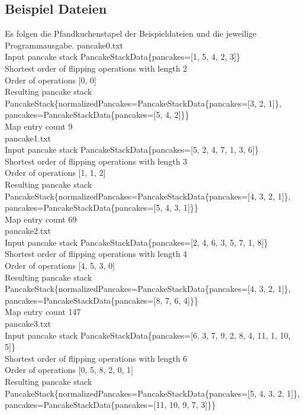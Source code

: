 \subsection{Beispiel Dateien}\label{subsec:beispiel-dateien}
Es folgen die Pfandkuchenstapel der Beispieldateien und die jeweilige Programmausgabe.
pancake0.txt \\
Input pancake stack PancakeStackData\{pancakes=[1, 5, 4, 2, 3]\} \\
Shortest order of flipping operations with length 2 \\
Order of operations [0, 0] \\
Resulting pancake stack PancakeStack\{normalizedPancakes=PancakeStackData\{pancakes=[3, 2, 1]\}, pancakes=PancakeStackData\{pancakes=[5, 4, 2]\}\} \\
Map entry count 9 \\
pancake1.txt \\
Input pancake stack PancakeStackData\{pancakes=[5, 2, 4, 7, 1, 3, 6]\} \\
Shortest order of flipping operations with length 3 \\
Order of operations [1, 1, 2] \\
Resulting pancake stack PancakeStack\{normalizedPancakes=PancakeStackData\{pancakes=[4, 3, 2, 1]\}, pancakes=PancakeStackData\{pancakes=[5, 4, 3, 1]\}\} \\
Map entry count 69 \\
pancake2.txt \\
Input pancake stack PancakeStackData\{pancakes=[2, 4, 6, 3, 5, 7, 1, 8]\} \\
Shortest order of flipping operations with length 4 \\
Order of operations [4, 5, 3, 0] \\
Resulting pancake stack PancakeStack\{normalizedPancakes=PancakeStackData\{pancakes=[4, 3, 2, 1]\}, pancakes=PancakeStackData\{pancakes=[8, 7, 6, 4]\}\} \\
Map entry count 147 \\
pancake3.txt \\
Input pancake stack PancakeStackData\{pancakes=[6, 3, 7, 9, 2, 8, 4, 11, 1, 10, 5]\} \\
Shortest order of flipping operations with length 6 \\
Order of operations [0, 5, 8, 2, 0, 1] \\
Resulting pancake stack PancakeStack\{normalizedPancakes=PancakeStackData\{pancakes=[5, 4, 3, 2, 1]\}, pancakes=PancakeStackData\{pancakes=[11, 10, 9, 7, 3]\}\} \\
